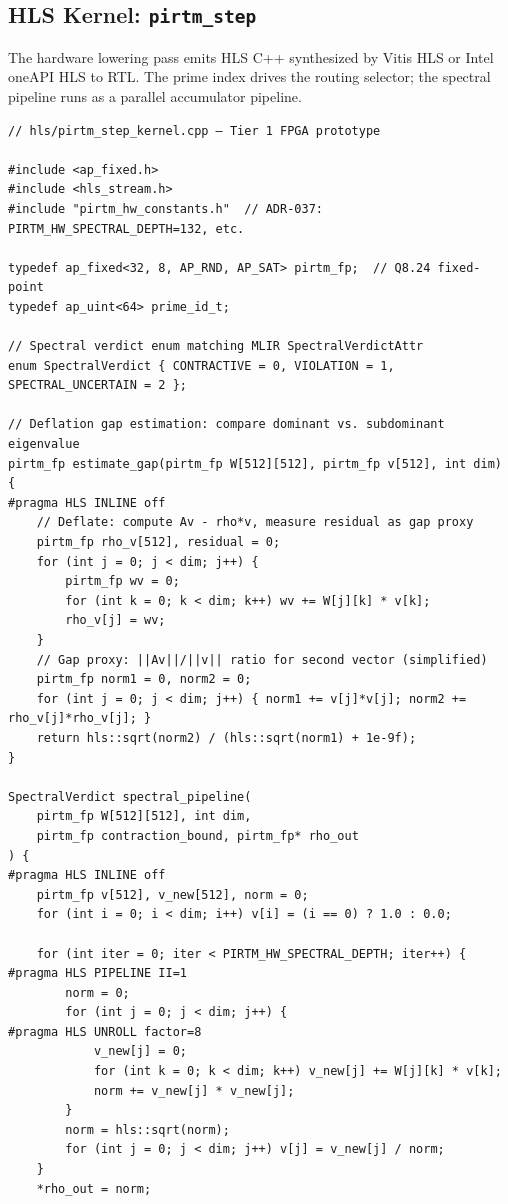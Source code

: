 \documentclass[12pt,letterpaper]{article}
\theoremstyle{plain}
\theoremstyle{definition}
\theoremstyle{remark}
\begin{document}
\subsection{HLS Kernel: \texttt{pirtm\_step}}

The hardware lowering pass emits HLS C++ synthesized by Vitis HLS or Intel
oneAPI HLS to RTL. The prime index drives the routing selector; the spectral
pipeline runs as a parallel accumulator pipeline.

\begin{lstlisting}[style=cppstyle, caption={HLS kernel \texttt{pirtm\_step\_kernel.cpp}}, label=lst:hls]
// hls/pirtm_step_kernel.cpp — Tier 1 FPGA prototype

#include <ap_fixed.h>
#include <hls_stream.h>
#include "pirtm_hw_constants.h"  // ADR-037: PIRTM_HW_SPECTRAL_DEPTH=132, etc.

typedef ap_fixed<32, 8, AP_RND, AP_SAT> pirtm_fp;  // Q8.24 fixed-point
typedef ap_uint<64> prime_id_t;

// Spectral verdict enum matching MLIR SpectralVerdictAttr
enum SpectralVerdict { CONTRACTIVE = 0, VIOLATION = 1, SPECTRAL_UNCERTAIN = 2 };

// Deflation gap estimation: compare dominant vs. subdominant eigenvalue
pirtm_fp estimate_gap(pirtm_fp W[512][512], pirtm_fp v[512], int dim) {
#pragma HLS INLINE off
    // Deflate: compute Av - rho*v, measure residual as gap proxy
    pirtm_fp rho_v[512], residual = 0;
    for (int j = 0; j < dim; j++) {
        pirtm_fp wv = 0;
        for (int k = 0; k < dim; k++) wv += W[j][k] * v[k];
        rho_v[j] = wv;
    }
    // Gap proxy: ||Av||/||v|| ratio for second vector (simplified)
    pirtm_fp norm1 = 0, norm2 = 0;
    for (int j = 0; j < dim; j++) { norm1 += v[j]*v[j]; norm2 += rho_v[j]*rho_v[j]; }
    return hls::sqrt(norm2) / (hls::sqrt(norm1) + 1e-9f);
}

SpectralVerdict spectral_pipeline(
    pirtm_fp W[512][512], int dim,
    pirtm_fp contraction_bound, pirtm_fp* rho_out
) {
#pragma HLS INLINE off
    pirtm_fp v[512], v_new[512], norm = 0;
    for (int i = 0; i < dim; i++) v[i] = (i == 0) ? 1.0 : 0.0;

    for (int iter = 0; iter < PIRTM_HW_SPECTRAL_DEPTH; iter++) {
#pragma HLS PIPELINE II=1
        norm = 0;
        for (int j = 0; j < dim; j++) {
#pragma HLS UNROLL factor=8
            v_new[j] = 0;
            for (int k = 0; k < dim; k++) v_new[j] += W[j][k] * v[k];
            norm += v_new[j] * v_new[j];
        }
        norm = hls::sqrt(norm);
        for (int j = 0; j < dim; j++) v[j] = v_new[j] / norm;
    }
    *rho_out = norm;


\end{lstlisting}
\end{document}
